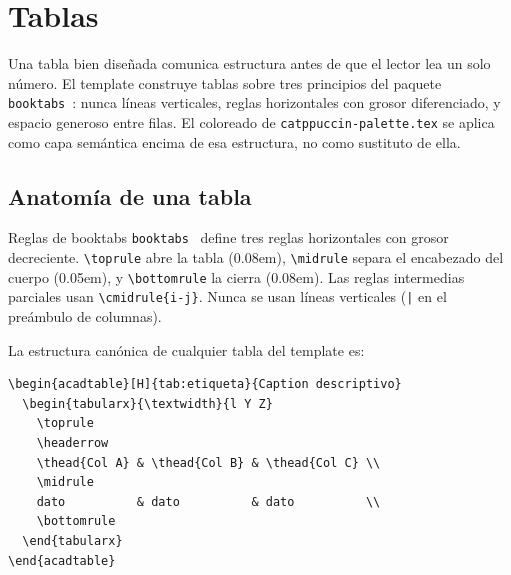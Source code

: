 \chapter{Tablas}
\label{ch:tablas}

Una tabla bien diseñada comunica estructura antes de que el lector lea un
solo número. El template construye tablas sobre tres principios del paquete
\texttt{booktabs}~\cite{booktabs2020}: nunca líneas verticales, reglas
horizontales con grosor diferenciado, y espacio generoso entre filas. El
coloreado de \texttt{catppuccin-palette.tex} se aplica como capa semántica
encima de esa estructura, no como sustituto de ella.

\section{Anatomía de una tabla}
\label{sec:tabla-anatomia}

\begin{definicion}{Reglas de booktabs}
\label{def:booktabs}
\texttt{booktabs}~\cite{booktabs2020} define tres reglas horizontales con
grosor decreciente. \texttt{\textbackslash toprule} abre la tabla (0.08em),
\texttt{\textbackslash midrule} separa el encabezado del cuerpo (0.05em),
y \texttt{\textbackslash bottomrule} la cierra (0.08em). Las reglas
intermedias parciales usan \texttt{\textbackslash cmidrule\{i-j\}}.
Nunca se usan líneas verticales (\texttt{|} en el preámbulo de columnas).
\end{definicion}

La estructura canónica de cualquier tabla del template es:

\begin{lstlisting}[style=latex, frame=none, numbers=none]
\begin{acadtable}[H]{tab:etiqueta}{Caption descriptivo}
  \begin{tabularx}{\textwidth}{l Y Z}
    \toprule
    \headerrow
    \thead{Col A} & \thead{Col B} & \thead{Col C} \\
    \midrule
    dato          & dato          & dato          \\
    \bottomrule
  \end{tabularx}
\end{acadtable}
\end{lstlisting}

